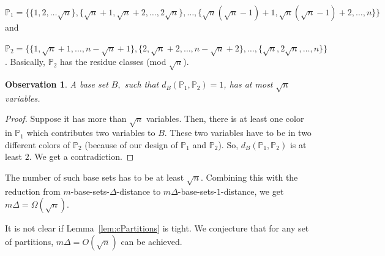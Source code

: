 \documentclass[final,oneeqnum, onethmnum, onefignum]{siamltex1213}
\renewcommand{\P}{\mathbb P}
\newcommand{\di}{\Delta} %
\newtheorem{observation}[theorem]{Observation}
\begin{document}
$\P_1 = \{\{1,2, \dots \sqrt{n}\}, 
\{\sqrt{n}+1, \sqrt{n} + 2, \dots, 2\sqrt{n} \}, 
\dots, \{\sqrt{n}(\sqrt{n}-1)+1, \sqrt{n}(\sqrt{n}-1)+2, \dots, n \} \}$ 
and 

$\P_2 = \{\{1,\sqrt{n}+1, \dots, n- \sqrt{n}+1\}, 
\{2,\sqrt{n}+2, \dots, n- \sqrt{n}+2\}, 
\dots, \{ \sqrt{n}, 2 \sqrt{n}, \dots, n\} \}$. 
Basically, $\P_2$ has the residue classes (mod $\sqrt{n}$).
\begin{observation}
A base set $B,$ such that $d_B(\P_1,\P_2) = 1$,
has at most $\sqrt{n}$ variables. 
\end{observation}
\begin{proof}
Suppose it has more than $\sqrt{n}$ variables.
Then, there is at least one color in $\P_1$ which
contributes two variables to $B$. These two variables have to be in two different colors of $\P_2$ 
(because of our design of $\P_1$ and $\P_2$).
So, $d_B(\P_1,\P_2)$ is at least $2$. We get a 
contradiction.
\end{proof}

The number of such base sets has to be at least $\sqrt{n}$.
Combining this with the reduction from $m$-base-sets-$\di$-distance
to $m \di$-base-sets-$1$-distance, we get $m \di = \Omega(\sqrt{n})$.

It is not clear if Lemma~\ref{lem:cPartitions} is tight. We conjecture
that for any set of partitions, $m \di = O(\sqrt{n})$ can be achieved. 
\end{document}
